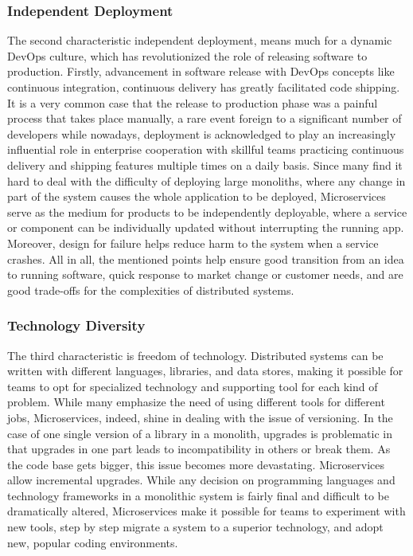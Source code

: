\documentclass[a4paper]{book}
\begin{document}
\subsubsection{Independent Deployment}
The second characteristic independent deployment, means much for a dynamic DevOps \cite{DevOps} culture, which has revolutionized the role of releasing software to production. Firstly, advancement in software release with DevOps concepts like continuous integration, continuous delivery has greatly facilitated code shipping. It is a very common case that the release to production phase was a painful process that takes place manually, a rare event foreign to a significant number of developers while nowadays, deployment is acknowledged to play an increasingly influential role in enterprise cooperation with skillful teams practicing continuous delivery and shipping features multiple times on a daily basis. Since many find it hard to deal with the difficulty of deploying large monoliths, where any change in part of the system causes the whole application to be deployed, Microservices serve as the medium for products to be independently deployable, where a service or component can be individually updated without interrupting the running app. Moreover, design for failure helps reduce harm to the system when a service crashes.  All in all, the mentioned points help ensure good transition from an idea to running software, quick response to market change or customer needs, and are good trade-offs for the complexities of distributed systems. \cite{Lew14, MTO}

\subsubsection{Technology Diversity}
The third characteristic is freedom of technology. Distributed systems can be written with different languages, libraries, and data stores, making it possible for teams to opt for specialized technology and supporting tool for each kind of problem. While many emphasize the need of using different tools for different jobs, Microservices, indeed, shine in dealing with the issue of versioning. In the case of one single version of a library in a monolith, upgrades is problematic in that upgrades in one part leads to incompatibility in others or break them. As the code base gets bigger, this issue becomes more devastating. Microservices allow incremental upgrades. While any decision on programming languages and technology frameworks in a monolithic system is fairly final and difficult to be dramatically altered, Microservices make it possible for teams to experiment with new tools, step by step migrate a system to a superior technology, and adopt new, popular coding environments. \cite{Lew14, MTO} 
\end{document}

